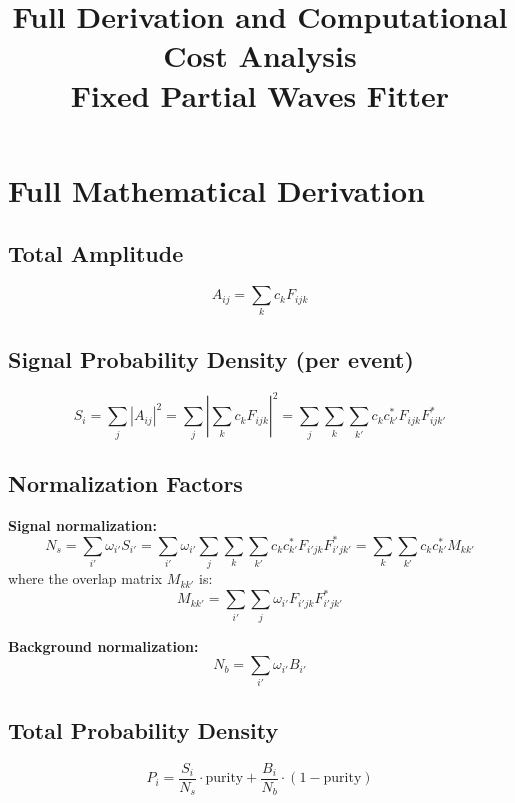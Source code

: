 \documentclass[11pt,a4paper]{article}
\title{\vspace{-2em}\textbf{Full Derivation and Computational Cost Analysis}\\[0.5em]\large Fixed Partial Waves Fitter}
\author{}
\date{}
\begin{document}
\maketitle

\section{Full Mathematical Derivation}

\subsection{Total Amplitude}
\begin{equation}
A_{ij} = \sum_{k} c_k F_{ijk}
\end{equation}

\subsection{Signal Probability Density (per event)}
\begin{equation}
S_i = \sum_{j} |A_{ij}|^2 = \sum_{j} \left|\sum_{k} c_k F_{ijk}\right|^2 = \sum_{j} \sum_{k} \sum_{k'} c_k c_{k'}^* F_{ijk} F_{ijk'}^*
\end{equation}

\subsection{Normalization Factors}

\textbf{Signal normalization:}
\begin{equation}
N_s = \sum_{i'} \omega_{i'} S_{i'} = \sum_{i'} \omega_{i'} \sum_{j} \sum_{k} \sum_{k'} c_k c_{k'}^* F_{i'jk} F_{i'jk'}^* = \sum_{k} \sum_{k'} c_k c_{k'}^* M_{kk'}
\end{equation}
where the overlap matrix $M_{kk'}$ is:
\begin{equation}
M_{kk'} = \sum_{i'} \sum_{j} \omega_{i'} F_{i'jk} F_{i'jk'}^*
\end{equation}

\textbf{Background normalization:}
\begin{equation}
N_b = \sum_{i'} \omega_{i'} B_{i'}
\end{equation}

\subsection{Total Probability Density}
\begin{equation}
P_i = \frac{S_i}{N_s} \cdot \text{purity} + \frac{B_i}{N_b} \cdot (1 - \text{purity})
\end{equation}
\end{document}
